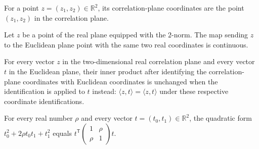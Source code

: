 \begin{definition}
\label{FABL.euclideanCorrelationCoordinates}
\leanok
{}
For a point $z=(z_1,z_2)\in\mathbb{R}^2$, its correlation-plane coordinates are the
point $(z_1,z_2)$ in the correlation plane.
\end{definition}

\begin{theorem}
\label{FABL.continuous_correlationEuclideanCoordinates}
\leanok
{}
Let $z$ be a point of the real plane equipped with the $2$-norm. The map sending $z$ to
the Euclidean plane point with the same two real coordinates is continuous.
\end{theorem}

\begin{theorem}
\label{FABL.inner_correlationEuclideanCoordinates}
\leanok
{}
For every vector $z$ in the two-dimensional real correlation plane and every vector $t$
in the Euclidean plane, their inner product after identifying the correlation-plane
coordinates with Euclidean coordinates is unchanged when the identification is applied
to $t$ instead: $\langle z,t\rangle=\langle z,t\rangle$ under these respective
coordinate identifications.
\end{theorem}

\begin{theorem}
\label{FABL.correlationQuadraticForm_euclideanCorrelationCoordinates}
\leanok
{}
For every real number $\rho$ and every vector $t=(t_0,t_1)\in\mathbb{R}^2$, the
quadratic form $t_0^2+2\rho t_0t_1+t_1^2$ equals $t^{\mathsf
T}\begin{pmatrix}1&\rho\\\rho&1\end{pmatrix}t$.
\end{theorem}

